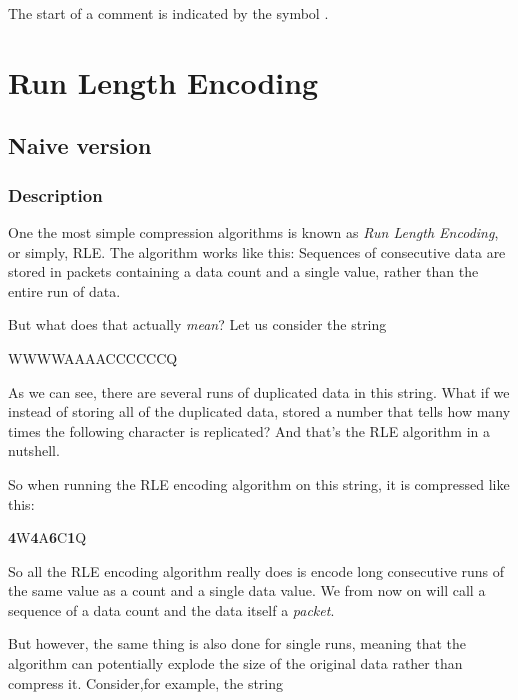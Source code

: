\begin{refsection}
The start of a comment is indicated by the symbol \commentsymbol.

\section{Run Length Encoding}
\label{sec:rle}

\subsection{Naive version}
\label{sec:naive-version}

\subsubsection{Description}
\label{sec:description}

One the most simple compression algorithms is known as \textit{Run
  Length Encoding}, or simply,
RLE\cite{nagarajan11:_enhan_approac_run_lengt_encod_schem}.
The algorithm works like this: Sequences of consecutive data are
stored in packets containing a data count and a single value, rather
than the entire run of data.

But what does that actually \textit{mean}? Let us consider the string

\begin{indentpar}
  WWWWAAAACCCCCCQ
\end{indentpar}

As we can see, there are several runs of duplicated data in this
string. What if we instead of storing all of the duplicated data,
stored a number that tells how many times the following character
is replicated? And that's the RLE algorithm in a nutshell.

So when running the RLE encoding algorithm on this string, it is
compressed like this:

\newcommand{\pkt}[2]{\textbf{#1}#2}

\begin{indentpar}
  \pkt{4}{W}\pkt{4}{A}\pkt{6}{C}\pkt{1}{Q}
\end{indentpar}

So all the RLE encoding algorithm really does is encode long
consecutive runs of the same value as a count and a single data
value. We from now on will call a sequence of a data count and the
data itself a \textit{packet}.

But however, the same thing is also done for single runs, meaning that
the algorithm can potentially explode the size of the original data
rather than compress it. Consider,for example, the string


\end{refsection}
